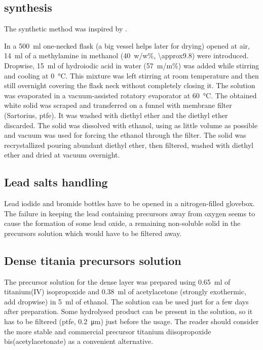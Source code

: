 	\subsection{ synthesis}\label{methods-MAI}


		The synthetic method was inspired by \cite{Im2011a, Aharon2014, Williams2014, Etgar2012a, Nagaoka2015}.

		In a \SI{500}{\ml} one-necked flask (a big vessel helps later for drying) opened at air, \SI{14}{\ml} of a methylamine in methanol (40~w/w\%, \SI{\approx9.8}{\Molar}) were introduced. Dropwise, \SI{15}{\ml} of hydroiodic acid in water (57~m/m\%) was added while stirring and cooling at \SI{0}{\celsius}. This mixture was left stirring at room temperature and then still overnight covering the flask neck without completely closing it.
		The solution was evaporated in a vacuum-assisted rotatory evaporator at \SI{60}{\celsius}.
		The obtained white solid was scraped and transferred on a funnel with membrane filter (Sartorius, \gls{ptfe}). It was washed with diethyl ether and the diethyl ether discarded. The solid was dissolved with ethanol, using as little volume as possible and vacuum was used for forcing the ethanol through the filter. The solid was recrystallized pouring abundant diethyl ether, then filtered, washed with diethyl ether and dried at vacuum overnight.

	\subsection{Lead salts handling}

		Lead iodide and bromide bottles have to be opened in a nitrogen-filled glovebox. The failure in keeping the lead containing precursors away from oxygen seems to cause the formation of some lead oxide, a remaining non-soluble solid in the precursors solution which would have to be filtered away.

	\subsection{Dense titania precursors solution}\label{precursors_tio2}

		The precursor solution for the dense \TiOtwo layer was prepared using \SI{0.65}{\ml} of titanium(IV) isopropoxide and \SI{0.38}{\ml} of acetylacetone (strongly exothermic, add dropwise) in \SI{5}{\ml} of ethanol. The solution can be used just for a few days after preparation. Some hydrolysed product can be present in the solution, so it has to be filtered (\gls{ptfe}, \SI{0.2}{\um}) just before the usage. The reader should consider the more stable and commercial precursor titanium diisopropoxide bis(acetylacetonate) as a convenient alternative.


